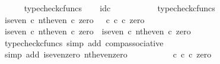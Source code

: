 \begin{isabellebody}
\ \ \ \ \isamarkupfalse%
\ typecheck{\isacharunderscore}{\kern0pt}cfuncs\isanewline
\ \ \isamarkupfalse%
\ {\isachardoublequoteopen}id\isactrlsub c\ {\isasymOmega}\ {\isacharcolon}{\kern0pt}\ {\isasymOmega}\ {\isasymrightarrow}\ {\isasymOmega}{\isachardoublequoteclose}\isanewline
\ \ \ \ \isamarkupfalse%
\ typecheck{\isacharunderscore}{\kern0pt}cfuncs\isanewline
\isanewline
\ \ \isamarkupfalse%
\ {\isachardoublequoteopen}{\isacharparenleft}{\kern0pt}is{\isacharunderscore}{\kern0pt}even\ {\isasymcirc}\isactrlsub c\ nth{\isacharunderscore}{\kern0pt}even{\isacharparenright}{\kern0pt}\ {\isasymcirc}\isactrlsub c\ zero\ {\isacharequal}{\kern0pt}\ {\isacharparenleft}{\kern0pt}{\isasymt}\ {\isasymcirc}\isactrlsub c\ {\isasymbeta}\isactrlbsub {\isasymnat}\isactrlsub c\isactrlesub {\isacharparenright}{\kern0pt}\ {\isasymcirc}\isactrlsub c\ zero{\isachardoublequoteclose}\isanewline
\ \ \isamarkupfalse%
\ {\isacharminus}{\kern0pt}\isanewline
\ \ \ \ \isamarkupfalse%
\ {\isachardoublequoteopen}{\isacharparenleft}{\kern0pt}is{\isacharunderscore}{\kern0pt}even\ {\isasymcirc}\isactrlsub c\ nth{\isacharunderscore}{\kern0pt}even{\isacharparenright}{\kern0pt}\ {\isasymcirc}\isactrlsub c\ zero\ {\isacharequal}{\kern0pt}\ is{\isacharunderscore}{\kern0pt}even\ {\isasymcirc}\isactrlsub c\ nth{\isacharunderscore}{\kern0pt}even\ {\isasymcirc}\isactrlsub c\ zero{\isachardoublequoteclose}\isanewline
\ \ \ \ \ \ \isamarkupfalse%
\ {\isacharparenleft}{\kern0pt}typecheck{\isacharunderscore}{\kern0pt}cfuncs{\isacharcomma}{\kern0pt}\ simp\ add{\isacharcolon}{\kern0pt}\ comp{\isacharunderscore}{\kern0pt}associative{}{\isacharparenright}{\kern0pt}\isanewline
\ \ \ \ \isamarkupfalse%
\ \isamarkupfalse%
\ {\isachardoublequoteopen}{\isachardot}{\kern0pt}{\isachardot}{\kern0pt}{\isachardot}{\kern0pt}\ {\isacharequal}{\kern0pt}\ {\isasymt}{\isachardoublequoteclose}\isanewline
\ \ \ \ \ \ \isamarkupfalse%
\ {\isacharparenleft}{\kern0pt}simp\ add{\isacharcolon}{\kern0pt}\ is{\isacharunderscore}{\kern0pt}even{\isacharunderscore}{\kern0pt}zero\ nth{\isacharunderscore}{\kern0pt}even{\isacharunderscore}{\kern0pt}zero{\isacharparenright}{\kern0pt}\isanewline
\ \ \ \ \isamarkupfalse%
\ \isamarkupfalse%
\ {\isachardoublequoteopen}{\isachardot}{\kern0pt}{\isachardot}{\kern0pt}{\isachardot}{\kern0pt}\ {\isacharequal}{\kern0pt}\ {\isacharparenleft}{\kern0pt}{\isasymt}\ {\isasymcirc}\isactrlsub c\ {\isasymbeta}\isactrlbsub {\isasymnat}\isactrlsub c\isactrlesub {\isacharparenright}{\kern0pt}\ {\isasymcirc}\isactrlsub c\ zero{\isachardoublequoteclose}\isanewline

\end{isabellebody}
